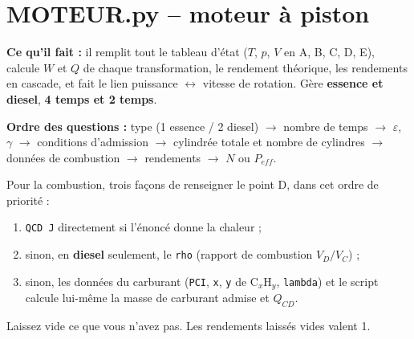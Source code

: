 \documentclass[10.5pt,a4paper]{article}
\begin{document}
\newpage
\section{MOTEUR.py -- moteur à piston}

\begin{objectif}
\textbf{Ce qu'il fait :} il remplit tout le tableau d'état ($T$, $p$, $V$ en A, B, C, D, E), calcule
$W$ et $Q$ de chaque transformation, le rendement théorique, les rendements en cascade, et fait le lien
puissance $\leftrightarrow$ vitesse de rotation. Gère \textbf{essence et diesel}, \textbf{4 temps et 2
temps}.
\end{objectif}

\textbf{Ordre des questions :} type (1 essence / 2 diesel) $\rightarrow$ nombre de temps $\rightarrow$
$\varepsilon$, $\gamma$ $\rightarrow$ conditions d'admission $\rightarrow$ cylindrée totale et nombre de
cylindres $\rightarrow$ données de combustion $\rightarrow$ rendements $\rightarrow$ $N$ ou $P_{eff}$.

\begin{piege}
Pour la combustion, trois façons de renseigner le point D, dans cet ordre de priorité :
\begin{enumerate}[leftmargin=1.4em,nosep]
\item \texttt{QCD J} directement si l'énoncé donne la chaleur ;
\item sinon, en \textbf{diesel} seulement, le \texttt{rho} (rapport de combustion $V_D/V_C$) ;
\item sinon, les données du carburant (\texttt{PCI}, \texttt{x}, \texttt{y} de C$_x$H$_y$,
\texttt{lambda}) et le script calcule lui-même la masse de carburant admise et $Q_{CD}$.
\end{enumerate}
Laissez vide ce que vous n'avez pas. Les rendements laissés vides valent 1.
\end{piege}
\end{document}
